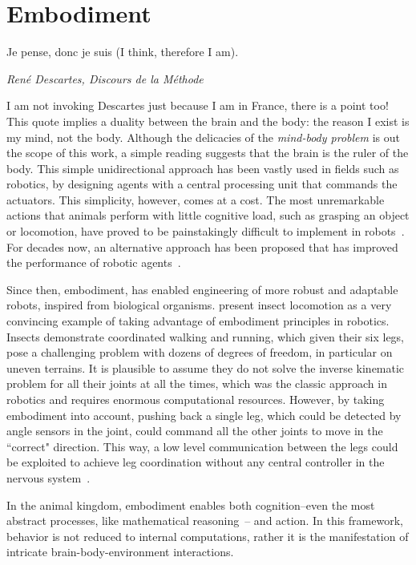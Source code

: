 \section{Embodiment}
\label{ch:intro:Embodiment}
\epigraph{Je pense, donc je suis (I think, therefore I am).}
{\textit{ Ren\'{e} Descartes, Discours de la M\'{e}thode}}
\noindent
I am not invoking Descartes just because I am in France, there is a point too!
This quote implies a duality between the brain and the body: the reason I exist is my mind, not the body.
Although the delicacies of the \emph{mind-body problem} is out the scope of this work, a simple reading suggests that the brain is the ruler of the body.
This simple unidirectional approach has been vastly used in fields such as robotics, by designing agents with a central processing unit that commands the actuators.
This simplicity, however, comes at a cost.
The most unremarkable actions that animals perform with little cognitive load, such as grasping an object or locomotion, have proved to be painstakingly difficult to implement in robots~\cite{Pfeifer2006Book}.
For decades now, an alternative approach has been proposed that has improved the performance of robotic agents~\cite{Brooks1991AI}.
\par
Since then, embodiment, has enabled engineering of more robust and adaptable robots, inspired from biological organisms.
\citeauthor{Pfeifer2007Sci} present insect locomotion as a very convincing example of taking advantage of embodiment principles in robotics.
Insects demonstrate coordinated walking and running, which given their six legs, pose a challenging problem with dozens of degrees of freedom, in particular on uneven terrains.
It is plausible to assume they do not solve the inverse kinematic problem for all their joints at all the times, which was the classic approach in robotics and requires enormous computational resources.
However, by taking embodiment into account, pushing back a single leg, which could be detected by angle sensors in the joint, could command all the other joints to move in the ``correct" direction.
This way, a low level communication between the legs could be exploited to achieve leg coordination without any central controller in the nervous system~\cite{Pfeifer2007Sci}.
\par
In the animal kingdom, embodiment enables both cognition--even the most abstract processes, like mathematical reasoning~\cite{Lakoff2000Book}-- and action.
In this framework, behavior is not reduced to internal computations, rather it is the manifestation of intricate brain-body-environment interactions.
